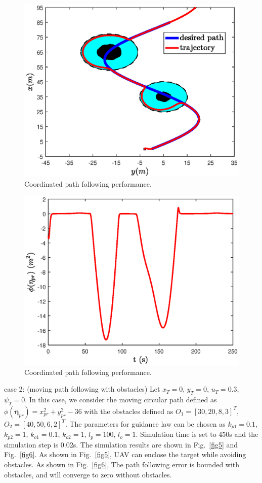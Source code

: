 \documentclass[a4paper, 10pt, conference]{ieeeconf}      %
\begin{document}
\begin{figure}[!htb]
	\centering
	\includegraphics[width=\hsize]{case1_map.eps}
	\caption{Coordinated path following performance.}
	\label{fig3}
\end{figure}

\begin{figure}[!htb]
	\centering
	\includegraphics[width=\hsize]{case1_error.eps}
	\caption{Coordinated path following performance.}
	\label{fig4}
\end{figure}

case 2: (moving path following with obstacles) Let $x_T=0$, $y_T=0$, $u_T=0.3$, $\psi_T=0$. In this case, we consider the moving circular path defined as $\phi(\bm{\eta}_{pr})=x_{pr}^2+y_{pr}^2-36$ with the obstacles defined as $O_1=[30,20,8,3]^T$, $O_2=[40,50,6,2]^T$. The parameters for guidance law can be chosen as $k_{p1}=0.1$, $k_{p2}=1$, $k_{o1}=0.1$, $k_{o2}=1$, $l_p=100$, $l_o=1$. Simulation time is set to 450s and the simulation step is 0.02s. The simulation results are shown in Fig.~\ref{fig5} and Fig.~\ref{fig6}. As shown in Fig.~\ref{fig5}, UAV can enclose the target while avoiding obstacles. As shown in Fig.~\ref{fig6}, The path following error is bounded with obstacles, and will converge to zero without obstacles.
\end{document}
